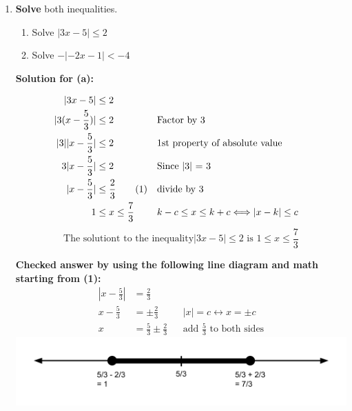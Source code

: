 \documentclass[12pt]{book}
\newcommand\numberthis{\addtocounter{equation}{1}\tag{\theequation}}
\begin{document}
\begin{enumerate}

\newpage

\item \textbf{Solve} both inequalities.

\begin{enumerate}
\item Solve $|3x-5| \le 2$
\item Solve $-|-2x-1| < -4$
\end{enumerate}

\vspace{0.3cm} 
\textbf{Solution for (a):}

\addtolength{\jot}{1em}
\begin{align*}
    |3x-5| & \le 2 \\
    |3(x - \frac{5}{3})| & \le 2 && \text{Factor by 3}\\
    |3||x - \frac{5}{3}| & \le 2 && \text{1st property of absolute value}\\
    3|x - \frac{5}{3}| & \le 2 && \text{Since |3| = 3}\\
    |x - \frac{5}{3}| & \le \frac{2}{3} \numberthis &&  \text{divide by 3}\\
    1 & \le x \le \frac{7}{3} && k - c \leq x \leq k + c \Longleftrightarrow |x-k| \leq c
\end{align*}
$$ \text{The solutiont to the inequality} |3x-5| \le 2 \text{ is } \boxed{1 \le x \le \frac{7}{3}} $$

\vspace{0.3em}
\textbf{Checked answer by using the following line diagram and math starting from (1):}
\addtolength{\jot}{0em}
\begin{align*}
    |x - \frac{5}{3}| & = \frac{2}{3}\\
    x - \frac{5}{3} & = \pm \frac{2}{3} && |x| = c \longleftrightarrow x = \pm c\\
    x & = \frac{5}{3} \pm \frac{2}{3} && \text{add $\frac{5}{3}$ to both sides}
\end{align*}
\includegraphics[width=\linewidth]{A1-2 proof 1 (1).png}


\end{enumerate}
\end{document}
